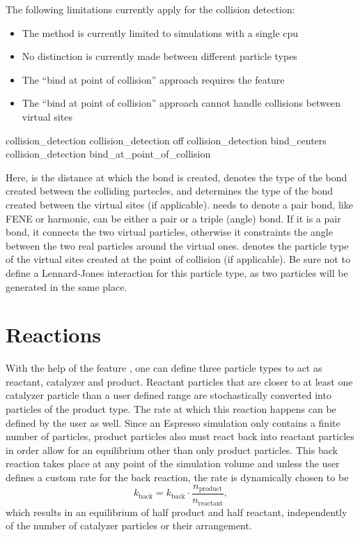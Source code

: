 The following limitations currently apply for the collision detection:
\begin{itemize}
\item The method is currently limited to simulations with a single cpu
\item No distinction is currently made between different particle types
\item The ``bind at point of collision'' approach requires the
   feature
\item The ``bind at point of collision'' approach cannot handle
  collisions between virtual sites
\end{itemize}


\begin{essyntax}
 collision_detection
 collision_detection off
 collision_detection bind_centers  
 collision_detection bind_at_point_of_collision    
\end{essyntax}

Here,  is the distance at which the bond is created,  denotes
the type of the bond created between the colliding partecles, and 
determines the type of the bond created between the virtual sites (if applicable).
 needs to denote a pair bond, like FENE or harmonic,  can
be either a pair or a triple (angle) bond. If it is a pair bond, it connects the
two virtual particles, otherwise it constraints the angle between the two real
particles around the virtual ones.  denotes the particle type of the
virtual sites created at the point of collision (if applicable). Be sure not to
define a Lennard-Jones interaction for this particle type, as two particles will
be generated in the same place.


\section{Reactions}
\label{sec:Reactions}

With the help of the feature , one can define three particle
types to act as reactant, catalyzer and product. Reactant particles that are 
closer to at least one catalyzer particle than a user defined range are 
stochastically converted into particles of the product type. The rate at which 
this reaction happens can be defined by the user as well. Since an Espresso 
simulation only contains a finite number of particles, product particles also
must react back into reactant particles in order allow for an equilibrium other 
than only product particles.
This back reaction takes place at any point of the simulation volume and unless 
the user defines a custom rate for the back reaction, the rate is dynamically 
chosen to be
\begin{equation}
k_\text{back} = k_\text{back} \cdot \frac{n_\text{product}}{n_\text{reactant}},
\end{equation}
which results in an equilibrium of half product and half reactant, independently 
of the number of catalyzer particles or their arrangement.


